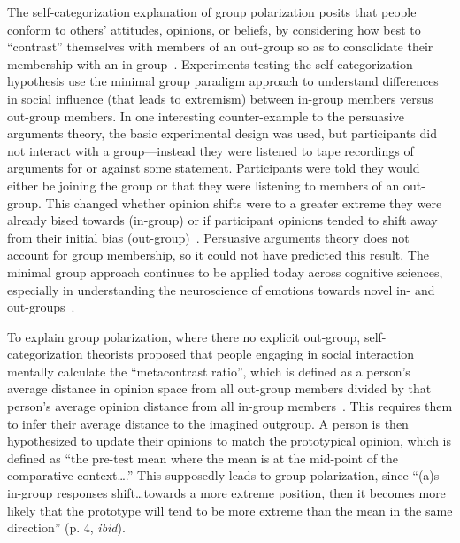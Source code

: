 The self-categorization explanation of group polarization 
posits that people conform to others' attitudes,
opinions, or beliefs, by considering how best to ``contrast'' themselves
with members of an out-group so as to consolidate their membership with
an in-group~\cite{Tajfel1971,Tajfel1979,Turner1987}. 
Experiments testing the self-categorization hypothesis use 
the minimal group paradigm approach to
understand differences in social influence (that leads to extremism) 
between in-group members versus out-group members. 
In one interesting counter-example to
the persuasive arguments theory, the basic experimental design was used, but
participants did not interact with a group---instead they were listened to 
tape recordings of arguments for or against some statement. Participants
were told they would either be joining the group or that they were listening
to members of an out-group. This changed whether opinion shifts were to a greater
extreme they were already bised towards (in-group) or if participant 
opinions tended to shift away from their initial bias (out-group)~\cite{McGarty1992}. 
Persuasive arguments theory does not account
for group membership, so it could not have predicted this result. 
The minimal group approach continues
to be applied today across cognitive sciences, especially in understanding
the neuroscience of emotions towards novel in- and 
out-groups~\cite{Cikara2014,Molenberghs2014}.

To explain
group polarization, where there no explicit out-group, self-categorization
theorists proposed that people engaging in social interaction mentally
calculate the ``metacontrast ratio'', which is defined as a person's average
distance in opinion space from all out-group members divided by that person's
average opinion distance from all in-group members~\cite[p. 3]{McGarty1992}.
This requires them to infer their average distance to the imagined outgroup.
A person is then hypothesized to update their opinions to match the prototypical
opinion, which is defined as ``the pre-test mean where the mean is at the mid-point
of the comparative context\ldots.'' This supposedly leads to group polarization, since
``(a)s in-group responses shift\ldots towards a more extreme position, 
then it becomes more likely that the prototype will tend to be more extreme than
the mean in the same direction'' (p. 4, \emph{ibid}). 

